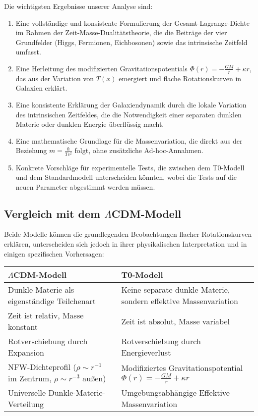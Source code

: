 \documentclass[a4paper,12pt]{article}
\newcommand{\Tfield}{T(x)}
\begin{document}
	Die wichtigsten Ergebnisse unserer Analyse sind:
	
	\begin{enumerate}
		\item Eine vollständige und konsistente Formulierung der Gesamt-Lagrange-Dichte im Rahmen der Zeit-Masse-Dualitätstheorie, die die Beiträge der vier Grundfelder (Higgs, Fermionen, Eichbosonen) sowie das intrinsische Zeitfeld umfasst.
		
		\item Eine Herleitung des modifizierten Gravitationspotentials \( \Phi(r) = -\frac{G M}{r} + \kappa r \), das aus der Variation von \( \Tfield \) emergiert und flache Rotationskurven in Galaxien erklärt.
		
		\item Eine konsistente Erklärung der Galaxiendynamik durch die lokale Variation des intrinsischen Zeitfeldes, die die Notwendigkeit einer separaten dunklen Materie oder dunklen Energie überflüssig macht.
		
		\item Eine mathematische Grundlage für die Massenvariation, die direkt aus der Beziehung \( m = \frac{\hbar}{T c^2} \) folgt, ohne zusätzliche Ad-hoc-Annahmen.
		
		\item Konkrete Vorschläge für experimentelle Tests, die zwischen dem T0-Modell und dem Standardmodell unterscheiden könnten, wobei die Tests auf die neuen Parameter abgestimmt werden müssen.
	\end{enumerate}
	
	\subsection{Vergleich mit dem $\Lambda$CDM-Modell}
	
	Beide Modelle können die grundlegenden Beobachtungen flacher Rotationskurven erklären, unterscheiden sich jedoch in ihrer physikalischen Interpretation und in einigen spezifischen Vorhersagen:
	
	\begin{tcolorbox}[colback=yellow!5!white,colframe=yellow!75!black,title=Vergleich der Modelle]
		\begin{tabular}{|p{}|p{}|}
			\hline
			\textbf{$\Lambda$CDM-Modell} & \textbf{T0-Modell} \\
			\hline
			Dunkle Materie als eigenständige Teilchenart & Keine separate dunkle Materie, sondern effektive Massenvariation \\
			\hline
			Zeit ist relativ, Masse konstant & Zeit ist absolut, Masse variabel \\
			\hline
			Rotverschiebung durch Expansion & Rotverschiebung durch Energieverlust \\
			\hline
			NFW-Dichteprofil ($\rho \sim r^{-1}$ im Zentrum, $\rho \sim r^{-3}$ außen) & Modifiziertes Gravitationspotential $\Phi(r) = -\frac{G M}{r} + \kappa r$ \\
			\hline
			Universelle Dunkle-Materie-Verteilung & Umgebungsabhängige Effektive Massenvariation \\
			\hline
		\end{tabular}
	\end{tcolorbox}
	
\end{document}
